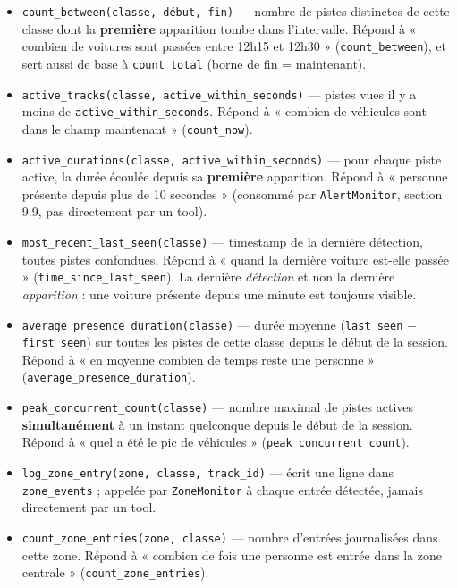\documentclass[11pt,a4paper]{article}
\begin{document}
    \begin{itemize}[leftmargin=1.5em]
      \item \texttt{count\_between(classe, début, fin)} --- nombre de
        pistes distinctes de cette classe dont la \textbf{première}
        apparition tombe dans l'intervalle. Répond à « combien de voitures
        sont passées entre 12h15 et 12h30 » (\texttt{count\_between}), et
        sert aussi de base à \texttt{count\_total} (borne de fin =
        maintenant).
      \item \texttt{active\_tracks(classe, active\_within\_seconds)} ---
        pistes vues il y a moins de \texttt{active\_within\_seconds}.
        Répond à « combien de véhicules sont dans le champ maintenant »
        (\texttt{count\_now}).
      \item \texttt{active\_durations(classe, active\_within\_seconds)} ---
        pour chaque piste active, la durée écoulée depuis sa
        \textbf{première} apparition. Répond à « personne présente depuis
        plus de 10 secondes » (consommé par \texttt{AlertMonitor}, section
        9.9, pas directement par un tool).
      \item \texttt{most\_recent\_last\_seen(classe)} --- timestamp de la
        dernière détection, toutes pistes confondues. Répond à « quand la
        dernière voiture est-elle passée » (\texttt{time\_since\_last\_seen}).
        La dernière \emph{détection} et non la dernière \emph{apparition} :
        une voiture présente depuis une minute est toujours visible.
      \item \texttt{average\_presence\_duration(classe)} --- durée moyenne
        (\texttt{last\_seen} $-$ \texttt{first\_seen}) sur toutes les pistes
        de cette classe depuis le début de la session. Répond à « en
        moyenne combien de temps reste une personne »
        (\texttt{average\_presence\_duration}).
      \item \texttt{peak\_concurrent\_count(classe)} --- nombre maximal de
        pistes actives \textbf{simultanément} à un instant quelconque
        depuis le début de la session. Répond à « quel a été le pic de
        véhicules » (\texttt{peak\_concurrent\_count}).
      \item \texttt{log\_zone\_entry(zone, classe, track\_id)} --- écrit
        une ligne dans \texttt{zone\_events} ; appelée par
        \texttt{ZoneMonitor} à chaque entrée détectée, jamais directement
        par un tool.
      \item \texttt{count\_zone\_entries(zone, classe)} --- nombre
        d'entrées journalisées dans cette zone. Répond à « combien de fois
        une personne est entrée dans la zone centrale »
        (\texttt{count\_zone\_entries}).
    \end{itemize}
    
\end{document}

